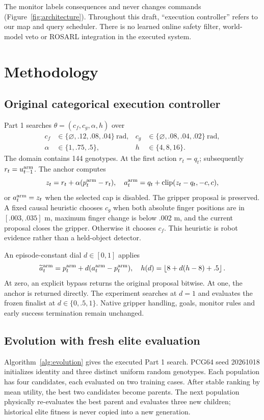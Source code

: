 \documentclass[sigconf,dvipsnames]{acmart}
\newcommand{\disabled}{\varnothing}
\begin{document}
The monitor labels consequences and never changes commands
(Figure~\ref{fig:architecture}). Throughout this draft, ``execution controller''
refers to our map and query scheduler. There is no learned online safety filter,
world-model veto or ROSARL integration in the executed system.

\section{Methodology}
\subsection{Original categorical execution controller}
Part 1 searches $\theta=(c_f,c_g,\alpha,h)$ over
\begin{align}
 c_f&\in\{\disabled,.12,.08,.04\}\ \mathrm{rad}, &
 c_g&\in\{\disabled,.08,.04,.02\}\ \mathrm{rad},\nonumber\\
 \alpha&\in\{1,.75,.5\}, &h&\in\{4,8,16\}.
\end{align}
The domain contains 144 genotypes. At the first action $r_t=q_t$; subsequently
$r_t=u_{t-1}^{\rm arm}$. The anchor computes
\begin{equation}
 z_t=r_t+\alpha(p_t^{\rm arm}-r_t),\quad
 a_t^{\rm arm}=q_t+\operatorname{clip}(z_t-q_t,-c,c),
 \label{eq:component}
\end{equation}
or $a_t^{\rm arm}=z_t$ when the selected cap is disabled. The gripper proposal is
preserved. A fixed causal heuristic chooses $c_g$ when both absolute finger positions
are in $[.003,.035]$ m, maximum finger change is below .002 m, and the current proposal
closes the gripper. Otherwise it chooses $c_f$. This heuristic is robot evidence
rather than a held-object detector.

An episode-constant dial $d\in[0,1]$ applies
\begin{equation}
 \widetilde a_t^{\rm arm}=p_t^{\rm arm}+d(a_t^{\rm arm}-p_t^{\rm arm}),\quad
 h(d)=\left\lfloor8+d(h-8)+.5\right\rfloor.
\end{equation}
At zero, an explicit bypass returns the original proposal bitwise. At one, the
anchor is returned directly. The experiment searches at $d=1$ and evaluates the
frozen finalist at $d\in\{0,.5,1\}$. Native gripper handling, goals, monitor rules
and early success termination remain unchanged.

\subsection{Evolution with fresh elite evaluation}
Algorithm~\ref{alg:evolution} gives the executed Part 1 search. PCG64 seed 20261018
initializes identity and three distinct uniform random genotypes. Each population
has four candidates, each evaluated on two training cases. After stable ranking
by mean utility, the best two candidates become parents. The next population
physically re-evaluates the best parent and evaluates three new children; historical
elite fitness is never copied into a new generation.
\end{document}
